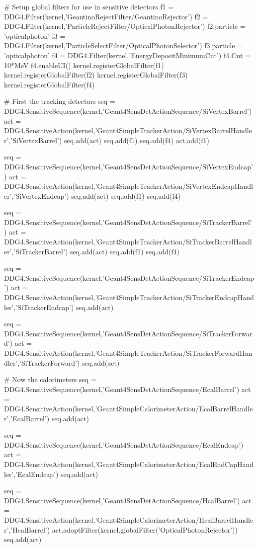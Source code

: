 \begin{code}
  # Setup global filters for use in sensitive detectors
  f1 = DDG4.Filter(kernel,'GeantinoRejectFilter/GeantinoRejector')
  f2 = DDG4.Filter(kernel,'ParticleRejectFilter/OpticalPhotonRejector')
  f2.particle = 'opticalphoton'
  f3 = DDG4.Filter(kernel,'ParticleSelectFilter/OpticalPhotonSelector') 
  f3.particle = 'opticalphoton'
  f4 = DDG4.Filter(kernel,'EnergyDepositMinimumCut')
  f4.Cut = 10*MeV
  f4.enableUI()
  kernel.registerGlobalFilter(f1)
  kernel.registerGlobalFilter(f2)
  kernel.registerGlobalFilter(f3)
  kernel.registerGlobalFilter(f4)

  # First the tracking detectors
  seq = DDG4.SensitiveSequence(kernel,'Geant4SensDetActionSequence/SiVertexBarrel')
  act = DDG4.SensitiveAction(kernel,'Geant4SimpleTrackerAction/SiVertexBarrelHandler','SiVertexBarrel')
  seq.add(act)
  seq.add(f1)
  seq.add(f4)
  act.add(f1)

  seq = DDG4.SensitiveSequence(kernel,'Geant4SensDetActionSequence/SiVertexEndcap')
  act = DDG4.SensitiveAction(kernel,'Geant4SimpleTrackerAction/SiVertexEndcapHandler','SiVertexEndcap')
  seq.add(act)
  seq.add(f1)
  seq.add(f4)

  seq = DDG4.SensitiveSequence(kernel,'Geant4SensDetActionSequence/SiTrackerBarrel')
  act = DDG4.SensitiveAction(kernel,'Geant4SimpleTrackerAction/SiTrackerBarrelHandler','SiTrackerBarrel')
  seq.add(act)
  seq.add(f1)
  seq.add(f4)

  seq = DDG4.SensitiveSequence(kernel,'Geant4SensDetActionSequence/SiTrackerEndcap')
  act = DDG4.SensitiveAction(kernel,'Geant4SimpleTrackerAction/SiTrackerEndcapHandler','SiTrackerEndcap')
  seq.add(act)

  seq = DDG4.SensitiveSequence(kernel,'Geant4SensDetActionSequence/SiTrackerForward')
  act = DDG4.SensitiveAction(kernel,'Geant4SimpleTrackerAction/SiTrackerForwardHandler','SiTrackerForward')
  seq.add(act)

  # Now the calorimeters
  seq = DDG4.SensitiveSequence(kernel,'Geant4SensDetActionSequence/EcalBarrel')
  act = DDG4.SensitiveAction(kernel,'Geant4SimpleCalorimeterAction/EcalBarrelHandler','EcalBarrel')
  seq.add(act)

  seq = DDG4.SensitiveSequence(kernel,'Geant4SensDetActionSequence/EcalEndcap')
  act = DDG4.SensitiveAction(kernel,'Geant4SimpleCalorimeterAction/EcalEndCapHandler','EcalEndcap')
  seq.add(act)

  seq = DDG4.SensitiveSequence(kernel,'Geant4SensDetActionSequence/HcalBarrel')
  act = DDG4.SensitiveAction(kernel,'Geant4SimpleCalorimeterAction/HcalBarrelHandler','HcalBarrel')
  act.adoptFilter(kernel.globalFilter('OpticalPhotonRejector'))
  seq.add(act)


\end{code}
